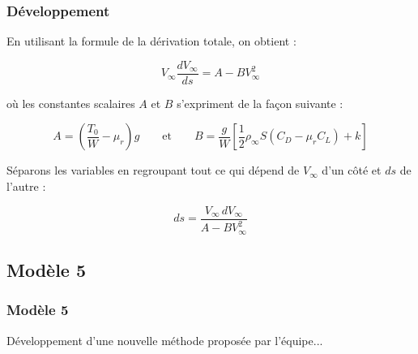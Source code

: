 		\begin{frame}
		
			\frametitle{Développement}
			
			En utilisant la formule de la dérivation totale, on obtient :
			
			\begin{equation}
				V_{\infty}\frac{dV_{\infty}}{ds}
				=
				A-BV_{\infty}^2
			\end{equation}
			
			où les constantes scalaires $A$ et $B$ s'expriment de la façon suivante :
			
			\begin{equation}
				A=
				\left(
				\frac{T_0}{W}-\mu_r
				\right)g
				\qquad
				\text{et}
				\qquad
				B=
				\frac{g}{W}
				\left[
				\frac{1}{2}\rho_{\infty}S(C_D-\mu_rC_L)+k
				\right]
			\end{equation}
			
			Séparons les variables en regroupant tout ce qui dépend de $V_{\infty}$ d'un côté et $ds$ de l'autre :
			
			\begin{equation}
				ds=
				\frac{V_{\infty}\,dV_{\infty}}
				{A-BV_{\infty}^2}
			\end{equation}
		
		\end{frame}

	
	\subsection{Modèle 5}
	
		\begin{frame}
			\frametitle{Modèle 5}
			Développement d'une nouvelle méthode proposée par l'équipe...
		\end{frame}
